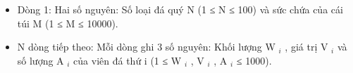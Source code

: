 \begin{itemize}
	\item     Dòng 1: Hai số nguyên: Số loại đá quý N (1 ≤ N ≤ 100) và sức chứa của cái túi M (1 ≤ M ≤ 10000).   
	\item     N dòng tiếp theo: Mỗi dòng ghi 3 số nguyên: Khối lượng W    $_     i    $    , giá trị V    $_     i    $    và số lượng A    $_     i    $    của viên đá thứ i (1 ≤ W    $_     i    $    , V    $_     i    $    , A    $_     i    $    ≤ 1000).   
\end{itemize}

\